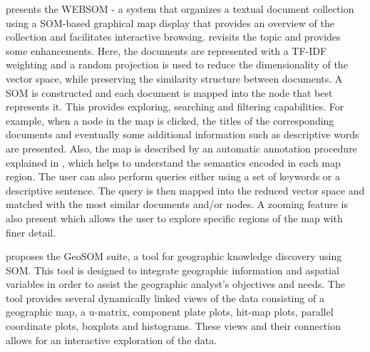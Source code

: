 \documentclass[a4paper]{article}
\begin{document}
\citet{kaski1998} presents the WEBSOM - a system that organizes a textual document collection using a SOM-based graphical map display that provides an overview of the collection and facilitates interactive browsing. \citet{kohonen2013} revisits the topic and provides some enhancements. Here, the documents are represented with a TF-IDF weighting and a random projection is used to reduce the dimensionality of the vector space, while preserving the similarity structure between documents. A SOM is constructed and each document is mapped into the node that best represents it. This provides exploring, searching and filtering capabilities. For example, when a node in the map is clicked, the titles of the corresponding documents and eventually some additional information such as descriptive words are presented. Also, the map is described by an automatic annotation procedure explained in \citet{lagus1999}, which helps to understand the semantics encoded in each map region. The user can also perform queries either using a set of keywords or a descriptive sentence. The query is then mapped into the reduced vector space and matched with the most similar documents and/or nodes. A zooming feature is also present which allows the user to explore specific regions of the map with finer detail.

\citet{henriques2012} proposes the GeoSOM suite, a tool for geographic knowledge discovery using SOM. This tool is designed to integrate geographic information and aspatial variables in order to assist the geographic analyst's objectives and needs. The tool provides several dynamically linked views of the data consisting of a geographic map, a u-matrix, component plate plots, hit-map plots, parallel coordinate plots, boxplots and histograms. These views and their connection allows for an interactive exploration of the data.
\end{document}
